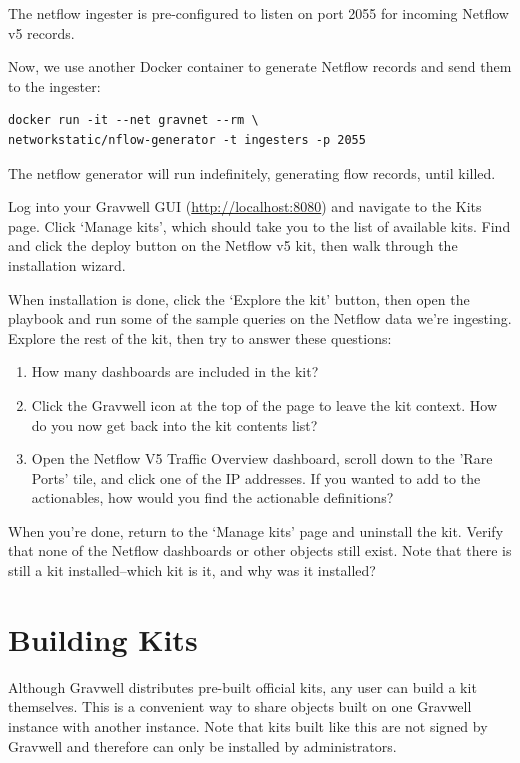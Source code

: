 The netflow ingester is pre-configured to listen on port 2055 for
incoming Netflow v5 records.

Now, we use another Docker container to generate Netflow records and
send them to the ingester:

\begin{Verbatim}[breaklines=true]
docker run -it --net gravnet --rm \
networkstatic/nflow-generator -t ingesters -p 2055
\end{Verbatim}

The netflow generator will run indefinitely, generating flow records,
until killed.

Log into your Gravwell GUI (\href{http://localhost:8080}{http://localhost:8080}) and navigate to the Kits page. Click `Manage kits', which should take you to the list of available kits. Find and click the deploy button on the Netflow v5 kit, then walk through the installation wizard.

When installation is done, click the `Explore the kit' button, then open the playbook and run some of the sample queries on the Netflow data we're ingesting. Explore the rest of the kit, then try to answer these questions:

\begin{enumerate}
\item
	How many dashboards are included in the kit?
\item
	Click the Gravwell icon at the top of the page to leave the kit context. How do you now get back into the kit contents list?
\item
	Open the Netflow V5 Traffic Overview dashboard, scroll down to the 'Rare Ports' tile, and click one of the IP addresses. If you wanted to add to the actionables, how would you find the actionable definitions?
\end{enumerate}

When you're done, return to the `Manage kits' page and uninstall the kit. Verify that none of the Netflow dashboards or other objects still exist. Note that there is still a kit installed--which kit is it, and why was it installed?

\section{Building Kits}
Although Gravwell distributes pre-built official kits, any user can build a kit themselves. This is a convenient way to share objects built on one Gravwell instance with another instance. Note that kits built like this are not signed by Gravwell and therefore can only be installed by administrators.

